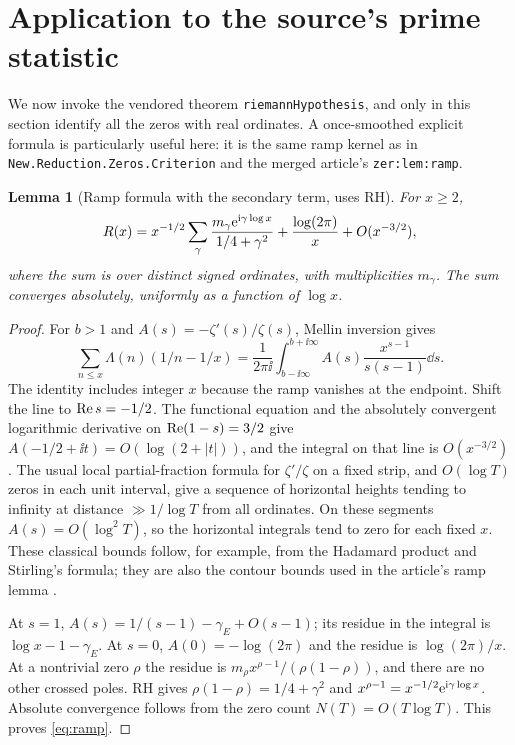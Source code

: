 \documentclass[11pt]{article}
\newtheorem{lemma}[theorem]{Lemma}
\theoremstyle{remark}\newtheorem{remark}[theorem]{Remark}
\begin{document}
\section{Application to the source's prime statistic}\label{sec:prime}
We now invoke the vendored theorem \texttt{riemannHypothesis}, and only in this section identify all the zeros with real ordinates. A once-smoothed explicit formula is particularly useful here: it is the same ramp kernel as in \texttt{New.Reduction.Zeros.Criterion} and the merged article's \texttt{zer:lem:ramp}.

\begin{lemma}[Ramp formula with the secondary term, uses RH]\label{lem:ramp}
For $x\ge2$,
\begin{equation}\label{eq:ramp}
R(x)=x^{-1/2}\sum_\gamma\frac{m_\gamma\mathrm e^{\mathrm i\gamma\log x}}{1/4+\gamma^2}+\frac{\log(2\pi)}x+O(x^{-3/2}),
\end{equation}
where the sum is over distinct signed ordinates, with multiplicities $m_\gamma$. The sum converges absolutely, uniformly as a function of $\log x$.
\end{lemma}
\begin{proof}
For $b>1$ and $A(s)=-\zeta'(s)/\zeta(s)$, Mellin inversion gives
\[
\sum_{n\le x}\Lambda(n)(1/n-1/x)=\frac1{2\pi\ii}\int_{b-\ii\infty}^{b+\ii\infty} A(s)\frac{x^{s-1}}{s(s-1)}\dd s.
\]
The identity includes integer $x$ because the ramp vanishes at the endpoint. Shift the line to $\operatorname{Re} s=-1/2$. The functional equation and the absolutely convergent logarithmic derivative on $\operatorname{Re}(1-s)=3/2$ give $A(-1/2+\ii t)=O(\log(2+|t|))$, and the integral on that line is $O(x^{-3/2})$. The usual local partial-fraction formula for $\zeta'/\zeta$ on a fixed strip, and $O(\log T)$ zeros in each unit interval, give a sequence of horizontal heights tending to infinity at distance $\gg1/\log T$ from all ordinates. On these segments $A(s)=O(\log^2 T)$, so the horizontal integrals tend to zero for each fixed $x$. These classical bounds follow, for example, from the Hadamard product and Stirling's formula; they are also the contour bounds used in the article's ramp lemma \cite{article,titchmarsh}.

At $s=1$, $A(s)=1/(s-1)-\gamma_E+O(s-1)$; its residue in the integral is $\log x-1-\gamma_E$. At $s=0$, $A(0)=-\log(2\pi)$ and the residue is $\log(2\pi)/x$. At a nontrivial zero $\rho$ the residue is $m_\rho x^{\rho-1}/(\rho(1-\rho))$, and there are no other crossed poles. RH gives $\rho(1-\rho)=1/4+\gamma^2$ and $x^{\rho-1}=x^{-1/2}\mathrm e^{\mathrm i\gamma\log x}$. Absolute convergence follows from the zero count $N(T)=O(T\log T)$. This proves \eqref{eq:ramp}.
\end{proof}
\end{document}
